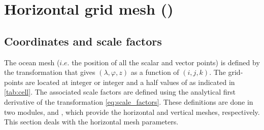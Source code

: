 \documentclass[../tex_main/NEMO_manual]{subfiles}
\begin{document}
\section{Horizontal grid mesh (\protect{})}
\label{sec:DOM_hgr}

\subsection{Coordinates and scale factors}
\label{subsec:DOM_hgr_coord_e}

The ocean mesh ($i.e.$ the position of all the scalar and vector points) is defined by
the transformation that gives $(\lambda,\varphi,z)$ as a function of $(i,j,k)$.
The grid-points are located at integer or integer and a half values of as indicated in \autoref{tab:cell}.
The associated scale factors are defined using the analytical first derivative of the transformation
\autoref{eq:scale_factors}.
These definitions are done in two modules,  and ,
which provide the horizontal and vertical meshes, respectively.
This section deals with the horizontal mesh parameters.
\end{document}
